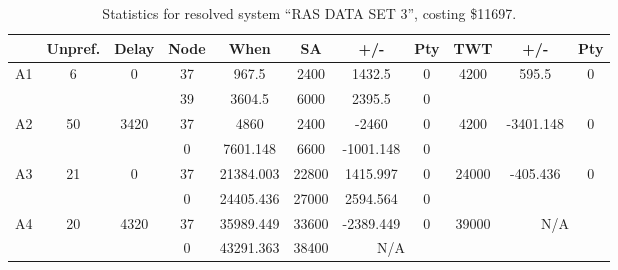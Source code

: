 \begin{sidewaystable}
\footnotesize
\caption{Statistics for resolved system ``RAS DATA SET 3'', costing \$11697.}
\centering
\begin{tabular}{c||c|c||c|c|c|c|c||c|c|c}
  \hline \hline
  &
  Unpref. & 
  Delay &
  Node &
  When &
  SA &
  +/- &
  Pty &
  TWT &
  +/- &
  Pty \\
      \hline
      \multirow{2}{*}{A1} &
      \multirow{2}{*}{6} &
      \multirow{2}{*}{0} &
      37 &
      967.5 &
      2400 &
        1432.5 &
        0 &
      \multirow{2}{*}{4200} &
        \multirow{2}{*}{595.5} &
        \multirow{2}{*}{0}
      \\
      \cline{4-8}
       &
       &
       &
      39 &
      3604.5 &
      6000 &
        2395.5 &
        0 &
      
         &
        
      \\
      \hline
      \multirow{2}{*}{A2} &
      \multirow{2}{*}{50} &
      \multirow{2}{*}{3420} &
      37 &
      4860 &
      2400 &
        -2460 &
        0 &
      \multirow{2}{*}{4200} &
        \multirow{2}{*}{-3401.148} &
        \multirow{2}{*}{0}
      \\
      \cline{4-8}
       &
       &
       &
      0 &
      7601.148 &
      6600 &
        -1001.148 &
        0 &
      
         &
        
      \\
      \hline
      \multirow{2}{*}{A3} &
      \multirow{2}{*}{21} &
      \multirow{2}{*}{0} &
      37 &
      21384.003 &
      22800 &
        1415.997 &
        0 &
      \multirow{2}{*}{24000} &
        \multirow{2}{*}{-405.436} &
        \multirow{2}{*}{0}
      \\
      \cline{4-8}
       &
       &
       &
      0 &
      24405.436 &
      27000 &
        2594.564 &
        0 &
      
         &
        
      \\
      \hline
      \multirow{2}{*}{A4} &
      \multirow{2}{*}{20} &
      \multirow{2}{*}{4320} &
      37 &
      35989.449 &
      33600 &
        -2389.449 &
        0 &
      \multirow{2}{*}{39000} &
        \multicolumn{2}{c}{\multirow{2}{*}{N/A}}
      \\
      \cline{4-8}
       &
       &
       &
      0 &
      43291.363 &
      38400 &
        \multicolumn{2}{|c||}{N/A} &
      

\end{tabular}
\end{sidewaystable}

